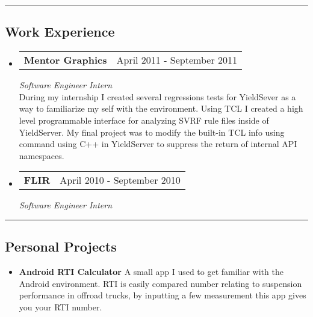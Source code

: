 \documentclass[10pt,letterpaper]{article}
\makeatletter
\newcommand{\heading}[2]
{\begin{tabular*}{\linewidth}{l@{\extracolsep{\fill}}r}
#1 &
#2 \\
\end{tabular*}}
\makeatother
\begin{document}
\hrule

\subsection*{Work Experience}
	\begin{itemize}
		\item 
		\heading
			{\textbf{Mentor Graphics}}
			{April 2011 - September 2011}
		\emph{Software Engineer Intern}\\
		During my internship I created several regressions tests for YieldSever as a way to familiarize my self with the environment. Using TCL I created a high level 						programmable interface for analyzing SVRF rule files inside of YieldServer. My final project was to modify the built-in TCL info using command using C++ in 						YieldServer to suppress the return of internal API namespaces. 
		\item 
		\heading
			{\textbf{FLIR}}
			{April 2010 - September 2010}
			\emph{Software Engineer Intern}
	\end{itemize}

\hrule

\subsection*{Personal Projects}
	\begin{itemize}
		\item 
			\textbf{Android RTI Calculator}
			A small app I used to get familiar with the Android environment. RTI is easily compared number relating to suspension performance in offroad trucks, by inputting a few  				measurement this app gives you your RTI number.
	\end{itemize}
\end{document}
